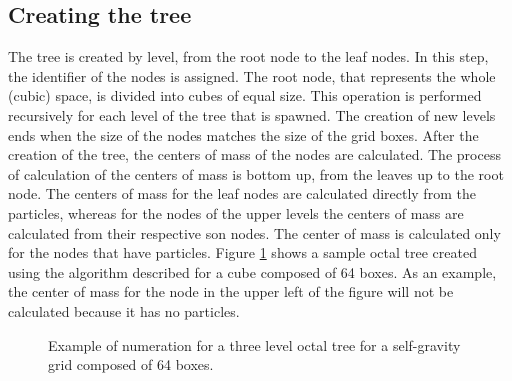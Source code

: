 \documentclass[runningheads]{llncs}
\begin{document}
\subsection{Creating the tree}

The tree is created by level, from the root node to the leaf nodes. In this step, the identifier of the nodes is assigned. The root node, that represents the whole (cubic) space, is divided into cubes of equal size. This operation is performed recursively for each level of the tree that is spawned. The creation of new levels ends when the size of the nodes matches the size of the grid boxes.  
After the creation of the tree, the centers of mass of the nodes are calculated. The process of calculation of the centers of mass is bottom up, from the leaves up to the root node. The centers of mass for the leaf nodes are calculated directly from the particles, whereas for the nodes of the upper levels the centers of mass are calculated from their respective son nodes. The center of mass is calculated only for the nodes that have particles. Figure \ref{fig:arb_octal} shows a sample octal tree created using the algorithm described for a cube composed of 64 boxes. As an example, the center of mass for the node in the upper left of the figure will not be calculated because it has no particles.  

\begin{figure}[!h]
\setlength{\abovecaptionskip}{3pt}

	\caption{Example of numeration for a three level octal tree for a self-gravity grid composed of 64 boxes.}
	\label{fig:arb_octal}
\end{figure}
\end{document}
